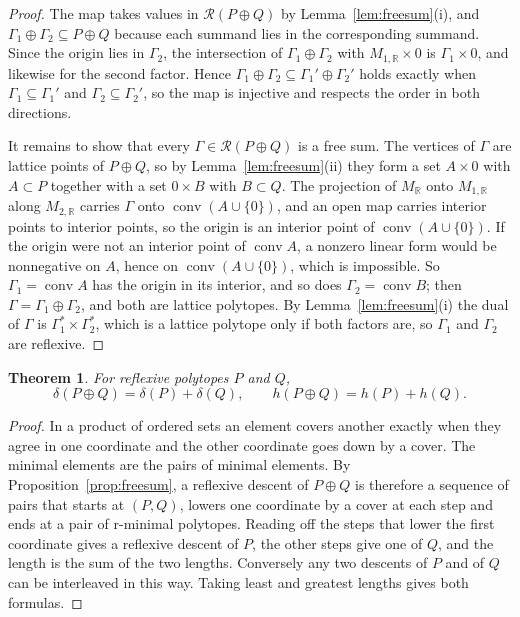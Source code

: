 \documentclass[11pt]{amsart}
\newtheorem{theorem}{Theorem}
\theoremstyle{definition}
\theoremstyle{remark}
\newcommand{\R}{\mathbb{R}}
\newcommand{\conv}{\operatorname{conv}}
\begin{document}
\begin{proof}
The map takes values in $\mathcal R(P\oplus Q)$ by
Lemma~\ref{lem:freesum}(i), and $\Gamma_1\oplus\Gamma_2\subseteq P\oplus
Q$ because each summand lies in the corresponding summand. Since the
origin lies in $\Gamma_2$, the intersection of $\Gamma_1\oplus\Gamma_2$
with $M_{1,\R}\times0$ is $\Gamma_1\times0$, and likewise for the second
factor. Hence $\Gamma_1\oplus\Gamma_2\subseteq\Gamma_1'\oplus\Gamma_2'$
holds exactly when $\Gamma_1\subseteq\Gamma_1'$ and
$\Gamma_2\subseteq\Gamma_2'$, so the map is injective and respects the
order in both directions.

It remains to show that every $\Gamma\in\mathcal R(P\oplus Q)$ is a free
sum. The vertices of $\Gamma$ are lattice points of $P\oplus Q$, so by
Lemma~\ref{lem:freesum}(ii) they form a set $A\times0$ with $A\subset P$
together with a set $0\times B$ with $B\subset Q$. The projection of
$M_\R$ onto $M_{1,\R}$ along $M_{2,\R}$ carries $\Gamma$ onto
$\conv(A\cup\{0\})$, and an open map carries interior points to interior
points, so the origin is an interior point of $\conv(A\cup\{0\})$. If the
origin were not an interior point of $\conv A$, a nonzero linear form
would be nonnegative on $A$, hence on $\conv(A\cup\{0\})$, which is
impossible. So $\Gamma_1=\conv A$ has the origin in its interior, and so
does $\Gamma_2=\conv B$; then $\Gamma=\Gamma_1\oplus\Gamma_2$, and both
are lattice polytopes. By Lemma~\ref{lem:freesum}(i) the dual of $\Gamma$
is $\Gamma_1^*\times\Gamma_2^*$, which is a lattice polytope only if both
factors are, so $\Gamma_1$ and $\Gamma_2$ are reflexive.
\end{proof}

\begin{theorem}\label{thm:freesum}
For reflexive polytopes $P$ and $Q$,
\[
\delta(P\oplus Q)=\delta(P)+\delta(Q),\qquad h(P\oplus Q)=h(P)+h(Q).
\]
\end{theorem}

\begin{proof}
In a product of ordered sets an element covers another exactly when they
agree in one coordinate and the other coordinate goes down by a cover.
The minimal elements are the pairs of minimal elements. By
Proposition~\ref{prop:freesum}, a reflexive descent of $P\oplus Q$ is
therefore a sequence of pairs that starts at $(P,Q)$, lowers one
coordinate by a cover at each step and ends at a pair of r-minimal
polytopes. Reading off the steps that lower the first coordinate gives a
reflexive descent of $P$, the other steps give one of $Q$, and the length
is the sum of the two lengths. Conversely any two descents of $P$ and of
$Q$ can be interleaved in this way. Taking least and greatest lengths
gives both formulas.
\end{proof}
\end{document}

